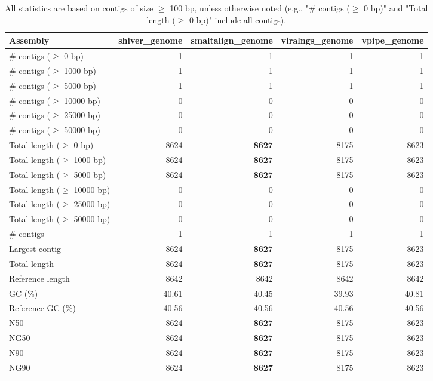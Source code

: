 \documentclass[12pt,a4paper]{article}
\begin{document}
\begin{table}[ht]
\begin{center}
\caption{All statistics are based on contigs of size $\geq$ 100 bp, unless otherwise noted (e.g., "\# contigs ($\geq$ 0 bp)" and "Total length ($\geq$ 0 bp)" include all contigs).}
\begin{tabular}{|l*{4}{|r}|}
\hline
Assembly & shiver\_genome & smaltalign\_genome & viralngs\_genome & vpipe\_genome \\ \hline
\# contigs ($\geq$ 0 bp) & 1 & 1 & 1 & 1 \\ \hline
\# contigs ($\geq$ 1000 bp) & 1 & 1 & 1 & 1 \\ \hline
\# contigs ($\geq$ 5000 bp) & 1 & 1 & 1 & 1 \\ \hline
\# contigs ($\geq$ 10000 bp) & 0 & 0 & 0 & 0 \\ \hline
\# contigs ($\geq$ 25000 bp) & 0 & 0 & 0 & 0 \\ \hline
\# contigs ($\geq$ 50000 bp) & 0 & 0 & 0 & 0 \\ \hline
Total length ($\geq$ 0 bp) & 8624 & {\bf 8627} & 8175 & 8623 \\ \hline
Total length ($\geq$ 1000 bp) & 8624 & {\bf 8627} & 8175 & 8623 \\ \hline
Total length ($\geq$ 5000 bp) & 8624 & {\bf 8627} & 8175 & 8623 \\ \hline
Total length ($\geq$ 10000 bp) & 0 & 0 & 0 & 0 \\ \hline
Total length ($\geq$ 25000 bp) & 0 & 0 & 0 & 0 \\ \hline
Total length ($\geq$ 50000 bp) & 0 & 0 & 0 & 0 \\ \hline
\# contigs & 1 & 1 & 1 & 1 \\ \hline
Largest contig & 8624 & {\bf 8627} & 8175 & 8623 \\ \hline
Total length & 8624 & {\bf 8627} & 8175 & 8623 \\ \hline
Reference length & 8642 & 8642 & 8642 & 8642 \\ \hline
GC (\%) & 40.61 & 40.45 & 39.93 & 40.81 \\ \hline
Reference GC (\%) & 40.56 & 40.56 & 40.56 & 40.56 \\ \hline
N50 & 8624 & {\bf 8627} & 8175 & 8623 \\ \hline
NG50 & 8624 & {\bf 8627} & 8175 & 8623 \\ \hline
N90 & 8624 & {\bf 8627} & 8175 & 8623 \\ \hline
NG90 & 8624 & {\bf 8627} & 8175 & 8623 \\ \hline

\end{tabular}
\end{center}
\end{table}
\end{document}
